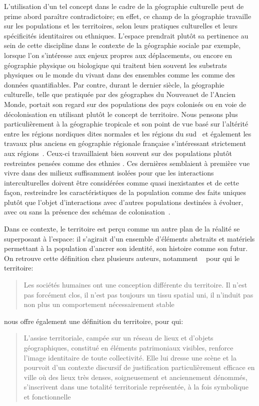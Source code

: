 L'utilisation d'un tel concept dans le cadre de la géographie culturelle peut de prime abord paraître contradictoire; en effet, ce champ de la géographie travaille  sur les populations et les territoires, selon leurs pratiques culturelles et leurs spécificités identitaires ou ethniques. 
L'espace prendrait plutôt sa pertinence au sein de cette discipline dans le contexte de la géographie sociale par exemple, lorsque l'on s'intéresse aux enjeux propres aux déplacements, ou encore en géographie physique ou biologique qui traitent bien souvent les substrats physiques ou le monde du vivant dans des ensembles comme les  comme des données quantifiables. 
Par contre, durant le dernier siècle, la géographie culturelle, telle que pratiquée par des géographes du Nouveau\missref et de l'Ancien Monde\missref, portait son regard sur des populations des pays colonisés ou en voie de décolonisation en utilisant plutôt le concept de territoire. 
Nous pensons plus particulièrement à la géographie tropicale et son point de vue basé sur l'altérité entre les régions nordiques dites normales et les régions du sud~\citep[493]{Power2009} et également les travaux plus anciens en géographie régionale française s'intéressant strictement aux régions~\citep[31]{Courville1991}. 
Ceux-ci travaillaient bien souvent sur des populations plutôt restreintes pensées comme des ethnies .
Ces dernières semblaient à première vue vivre dans des milieux suffisamment isolées pour que les interactions interculturelles doivent être considérées comme quasi inexistantes et de cette façon, restreindre les caractéristiques de la population comme des faits uniques plutôt que l'objet d'interactions avec d'autres populations destinées à évoluer, avec ou sans la présence des schémas de colonisation~\citep[79--80]{DiMeo2007}.

Dans ce contexte, le territoire est perçu comme un autre plan de la réalité se superposant à l'espace: il s'agirait d'un ensemble d'éléments abstraits et matériels permettant à la population d'ancrer son identité, son histoire comme son futur. 
On retrouve cette définition chez plusieurs auteurs, notamment ~\citeauthor{Bonnemaison1981} pour qui le territoire:
\blockquote[{\cite[253]{Bonnemaison1981}}][.]{Les sociétés humaines ont une conception différente du territoire. Il n'est pas forcément clos, il n'est pas toujours un tissu spatial uni, il n'induit pas non plus un comportement nécessairement stable}. 
\citeauthor{DiMeo2007} nous offre également une définition du territoire, pour qui:
\blockquote[{\cite[76]{DiMeo2007}}][.]{L’assise territoriale, campée sur un réseau de lieux et d’objets géographiques, constitué en éléments patrimoniaux visibles, renforce l’image identitaire de toute collectivité. Elle lui dresse une scène et la pourvoit d’un contexte discursif de justification particulièrement efficace en ville où des lieux très denses, soigneusement et anciennement dénommés, s’inscrivent dans une totalité territoriale représentée, à la fois symbolique et fonctionnelle}. 

